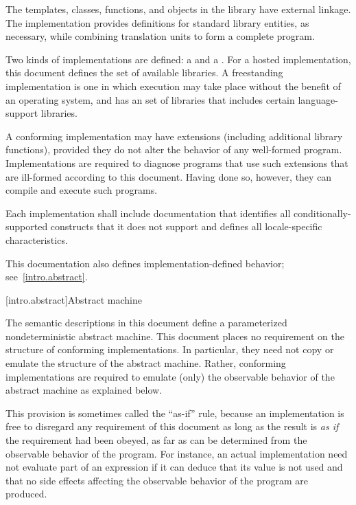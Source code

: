 \pnum
The templates, classes, functions, and objects in the library have
external linkage. The implementation provides
definitions for standard library entities, as necessary, while combining
translation units to form a complete \Cpp{}  program.%

\pnum
Two kinds of implementations are defined: a  and a
. For a hosted implementation, this
document defines the set of available libraries. A freestanding
implementation is one in which execution may take place without the benefit of
an operating system, and has an  set of libraries that includes certain language-support
libraries.

\pnum
A conforming implementation may have extensions (including
additional library functions), provided they do not alter the
behavior of any well-formed program.
Implementations are required to diagnose programs that use such
extensions that are ill-formed according to this document.
Having done so, however, they can compile and execute such programs.

\pnum
Each implementation shall include documentation that identifies all
conditionally-supported constructs
that it does not support and defines all locale-specific characteristics.
\begin{footnote}
This documentation also defines implementation-defined behavior;
see~\ref{intro.abstract}.
\end{footnote}
%
%

[intro.abstract]{Abstract machine}

\pnum
{}%
%
The semantic descriptions in this document define a
parameterized nondeterministic abstract machine. This document
places no requirement on the structure of conforming
implementations. In particular, they need not copy or emulate the
structure of the abstract machine.
%
%
Rather, conforming implementations are required to emulate (only) the observable
behavior of the abstract machine as explained below.
\begin{footnote}
This provision is
sometimes called the ``as-if'' rule, because an implementation is free to
disregard any requirement of this document as long as the result
is \emph{as if} the requirement had been obeyed, as far as can be determined
from the observable behavior of the program. For instance, an actual
implementation need not evaluate part of an expression if it can deduce that its
value is not used and that no
%
side effects affecting the
observable behavior of the program are produced.
\end{footnote}


